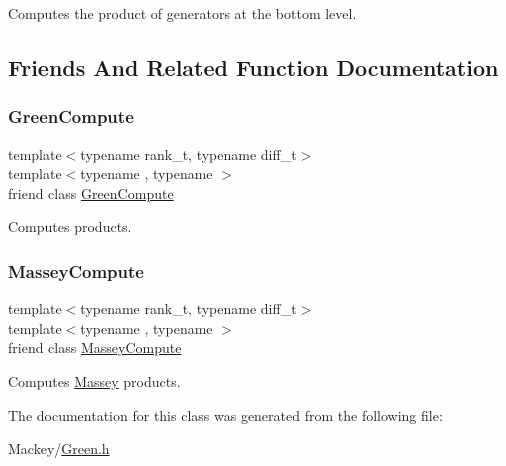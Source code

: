 Computes the product of generators at the bottom level. 

\subsection{Friends And Related Function Documentation}
\mbox{\label{classMackey_1_1internal_1_1ProductGen_a85de7c4aeeee34981e2020c2f9ddd3e2}} 
\subsubsection{\texorpdfstring{Green\+Compute}{GreenCompute}}
{\footnotesize\ttfamily template$<$typename rank\+\_\+t, typename diff\+\_\+t$>$ \\
template$<$typename , typename $>$ \\
friend class \hyperlink{classMackey_1_1internal_1_1GreenCompute}{Green\+Compute}\hspace{0.3cm}{\ttfamily [friend]}}



Computes products. 

\mbox{\label{classMackey_1_1internal_1_1ProductGen_af259bfb9b4dced17104ac8fbb697355c}} 
\subsubsection{\texorpdfstring{Massey\+Compute}{MasseyCompute}}
{\footnotesize\ttfamily template$<$typename rank\+\_\+t, typename diff\+\_\+t$>$ \\
template$<$typename , typename $>$ \\
friend class \hyperlink{classMackey_1_1internal_1_1MasseyCompute}{Massey\+Compute}\hspace{0.3cm}{\ttfamily [friend]}}



Computes \hyperlink{classMackey_1_1Massey}{Massey} products. 



The documentation for this class was generated from the following file\+:\begin{DoxyCompactItemize}
\item 
Mackey/\hyperlink{Green_8h}{Green.\+h}\end{DoxyCompactItemize}
